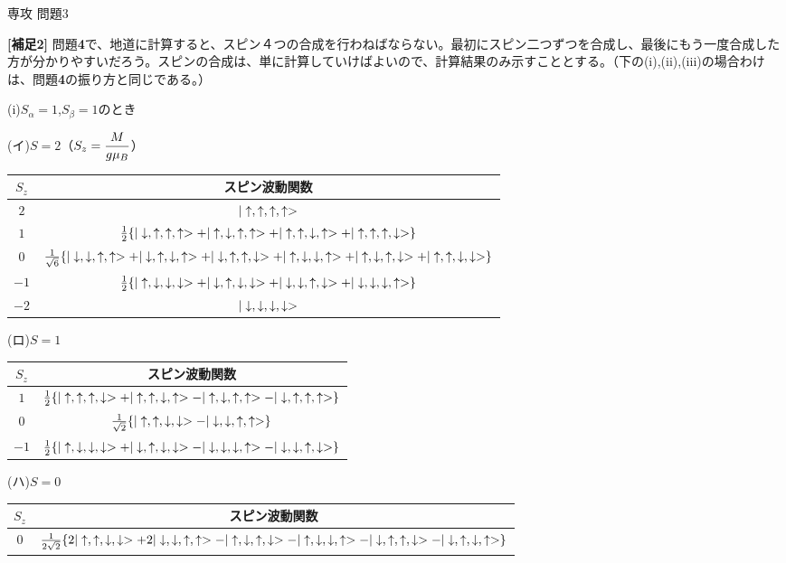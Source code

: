 \documentclass[fleqn]{jbook}
\begin{document}
\begin{answer}{専攻 問題3}{}
\begin{subanswers}
{\bf{[補足2]}} 問題{\bf{4}}で、地道に計算すると、スピン４つの合成を行わねばならない。最初にスピン二つずつを合成し、最後にもう一度合成した方が分かりやすいだろう。スピンの合成は、単に計算していけばよいので、計算結果のみ示すこととする。（下の(i),(ii),(iii)の場合わけは、問題{\bf{4}}の振り方と同じである。）

 (i)$S_\alpha=1$,$S_\beta=1$のとき

(イ)$S=2$（$S_z=\displaystyle\frac{M}{g\mu_B}$）

\begin{tabular}{|c|c|}\hline
$S_z$ & スピン波動関数 \\ \hline \hline
$2$ & $|\uparrow,\uparrow,\uparrow,\uparrow>$ \\ \hline
$1$ & $\frac{1}{2}\{ |\downarrow,\uparrow,\uparrow,\uparrow>+|\uparrow,\downarrow,\uparrow,\uparrow>+|\uparrow,\uparrow,\downarrow,\uparrow>+|\uparrow,\uparrow,\uparrow,\downarrow>\}$ \\ \hline
$0$ & $\frac{1}{\sqrt{6}}\{|\downarrow,\downarrow,\uparrow,\uparrow>+|\downarrow,\uparrow,\downarrow,\uparrow>+|\downarrow,\uparrow,\uparrow,\downarrow>+|\uparrow,\downarrow,\downarrow,\uparrow>+|\uparrow,\downarrow,\uparrow,\downarrow>+|\uparrow,\uparrow,\downarrow,\downarrow>\}$ \\ \hline
$-1$ & $\frac{1}{2}\{ |\uparrow,\downarrow,\downarrow,\downarrow>+|\downarrow,\uparrow,\downarrow,\downarrow>+|\downarrow,\downarrow,\uparrow,\downarrow>+|\downarrow,\downarrow,\downarrow,\uparrow>\}$ \\ \hline
$-2$ & $|\downarrow,\downarrow,\downarrow,\downarrow>$ \\ \hline
\end{tabular}

(ロ)$S=1$

\begin{tabular}{|c|c|}\hline
$S_z$ & スピン波動関数 \\ \hline \hline
$1$ & $\frac{1}{2}\{|\uparrow,\uparrow,\uparrow,\downarrow>+|\uparrow,\uparrow,\downarrow,\uparrow>-|\uparrow,\downarrow,\uparrow,\uparrow>-|\downarrow,\uparrow,\uparrow,\uparrow>\}$ \\ \hline
$0$ & $\frac{1}{\sqrt{2}}\{ |\uparrow,\uparrow,\downarrow,\downarrow>-|\downarrow,\downarrow,\uparrow,\uparrow> \}$ \\ \hline
$-1$ & $\frac{1}{2}\{|\uparrow,\downarrow,\downarrow,\downarrow>+|\downarrow,\uparrow,\downarrow,\downarrow>-|\downarrow,\downarrow,\downarrow,\uparrow>-|\downarrow,\downarrow,\uparrow,\downarrow>\}$ \\ \hline
\end{tabular}

(ハ)$S=0$

\begin{tabular}{|c|c|}\hline
$S_z$ & スピン波動関数 \\ \hline \hline
$0$ & $\frac{1}{2\sqrt{2}}\{ 
2|\uparrow,\uparrow,\downarrow,\downarrow>+2|\downarrow,\downarrow,\uparrow,\uparrow>-|\uparrow,\downarrow,\uparrow,\downarrow>-|\uparrow,\downarrow,\downarrow,\uparrow>-|\downarrow,\uparrow,\uparrow,\downarrow>-|\downarrow,\uparrow,\downarrow,\uparrow>
\}$ \\ \hline
\end{tabular}


\end{subanswers}
\end{answer}
\end{document}

